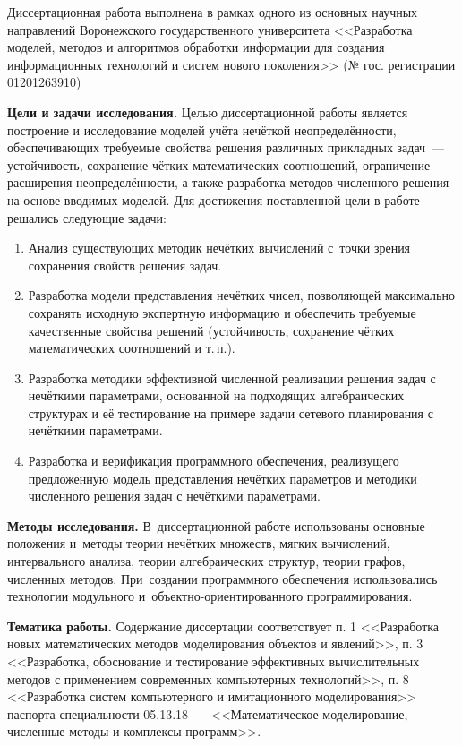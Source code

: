 Диссертационная работа выполнена в рамках одного из основных научных направлений Воронежского государственного университета <<Разработка моделей, методов и алгоритмов обработки информации для создания информационных технологий и систем нового поколения>> (№ гос. регистрации 01201263910)

\textbf{Цели и задачи исследования.} Целью диссертационной работы является построение и исследование моделей учёта нечёткой неопределённости, обеспечивающих требуемые свойства решения различных прикладных задач~--- устойчивость, сохранение чётких математических соотношений, ограничение расширения неопределённости, а также разработка методов численного решения на основе вводимых моделей. Для достижения поставленной цели в работе решались следующие задачи:
\begin{enumerate}
  \item Анализ существующих методик нечётких вычислений с~точки зрения сохранения свойств решения задач.
  \item Разработка модели представления нечётких чисел, позволяющей максимально сохранять исходную экспертную информацию и обеспечить требуемые качественные свойства решений (устойчивость, сохранение чётких математических соотношений и т.\,п.).
  \item Разработка методики эффективной численной реализации решения задач с нечёткими параметрами, основанной на подходящих алгебраических структурах и её тестирование на примере задачи сетевого планирования с нечёткими параметрами.
  \item Разработка и верификация программного обеспечения, реализущего предложенную модель представления нечётких параметров и методики численного решения задач с нечёткими параметрами.
\end{enumerate}

\textbf{Методы исследования.} В~диссертационной работе использованы основные положения и~методы теории нечётких множеств, мягких вычислений, интервального анализа, теории алгебраических структур, теории графов, численных методов. При~создании программного обеспечения использовались технологии модульного и~объектно-ориентированного программирования.

\textbf{Тематика работы.} Содержание диссертации соответствует п. 1 <<Разработка новых математических методов моделирования объектов и явлений>>, п. 3 <<Разработка, обоснование и тестирование эффективных вычислительных методов с применением современных компьютерных технологий>>, п. 8 <<Разработка систем компьютерного и имитационного моделирования>> паспорта специальности 05.13.18~--- <<Математическое моделирование, численные методы и комплексы программ>>.

